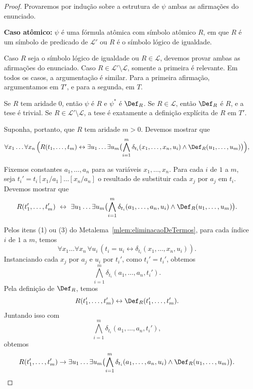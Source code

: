 \begin{proof}
    Provaremos por indução sobre a estrutura de $\psi$ ambas as afirmações do enunciado.

    \smallskip
    \textbf{Caso atômico:} $\psi$ é uma fórmula atômica com símbolo atômico $R$,
    em que $R$ é um símbolo de predicado de $\mathcal L'$ ou $R$ é o símbolo lógico de igualdade.

    Caso $R$ seja o símbolo lógico de igualdade ou $R \in \mathcal L$, devemos provar ambas as afirmações do enunciado.
    Caso $R \in \mathcal L'\setminus\mathcal L$, somente a primeira é relevante.
    Em todos os casos, a argumentação é similar.
    Para a primeira afirmação, argumentamos em $T'$, e para a segunda, em $T$.

    Se $R$ tem aridade $0$, então $\psi$ é $R$ e $\psi^\ast$ é $\Def_R$.
    Se $R\in\mathcal L$, então $\Def_R$ é $R$, e a tese é trivial.
    Se $R\in\mathcal L'\setminus\mathcal L$, a tese é exatamente a definição explícita de $R$ em $T'$.

    Suponha, portanto, que $R$ tem aridade $m>0$.
    Devemos mostrar que
    \[
        \forall x_1\ldots \forall x_n\,\Bigl(R(t_1,\ldots,t_m)\leftrightarrow
        \exists u_1\ldots \exists u_m\bigl(\bigwedge_{i=1}^m \delta_{t_i}(x_1,\ldots,x_n,u_i)\wedge \Def_R(u_1,\ldots,u_m)\bigr)\Bigr),
    \]

    Fixemos constantes $a_1,\ldots,a_n$ para as variáveis $x_1,\ldots,x_n$.
    Para cada $i$ de $1$ a $m$, seja $t_i'=t_i[x_1/a_1]\ldots[x_n/a_n]$ o resultado de substituir cada $x_j$ por $a_j$ em $t_i$.
    Devemos mostrar que
    \[
        R(t_1',\ldots,t_m')\ \leftrightarrow\
        \exists u_1\ldots \exists u_m\bigl(\bigwedge_{i=1}^m \delta_{t_i}(a_1,\ldots,a_n,u_i)\wedge \Def_R(u_1,\ldots,u_m)\bigr).
    \]

    Pelos itens (1) ou (3) do Metalema~\ref{mlem:eliminacaoDeTermos}, para cada índice $i$ de $1$ a $m$, temos
    \[
        \forall x_1\ldots \forall x_n\,\forall u_i\,(t_i=u_i\leftrightarrow \delta_{t_i}(x_1,\ldots,x_n,u_i)).
    \]
    Instanciando cada $x_j$ por $a_j$ e $u_i$ por $t_i'$, como $t_i'=t_i'$, obtemos
    \[
        \bigwedge_{i=1}^m \delta_{t_i}(a_1,\ldots,a_n,t_i').
    \]
    Pela definição de $\Def_R$, temos
    \[
        R(t_1',\ldots,t_m')\leftrightarrow \Def_R(t_1',\ldots,t_m').
    \]
    Juntando isso com
    \[
        \bigwedge_{i=1}^m \delta_{t_i}(a_1,\ldots,a_n,t_i'),
    \]
    obtemos
    \[
        R(t_1',\ldots,t_m')\rightarrow
        \exists u_1\ldots \exists u_m
        \bigl(\bigwedge_{i=1}^m \delta_{t_i}(a_1,\ldots,a_n,u_i)
        \wedge \Def_R(u_1,\ldots,u_m)\bigr).
    \]
    

\end{proof}
